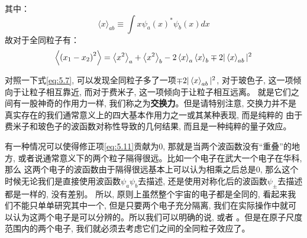 \documentclass[a4paper,zihao=-4,linespread=1]{ctexrep}
\begin{document}
    其中：
    \begin{equation}
        \label{eq:5.11}
        \langle x\rangle_{a b} \equiv \int x \psi_{a}(x)^{*} \psi_{b}(x) d x
    \end{equation}
    故对于全同粒子有：
    \begin{equation}
        \Braket{\left(x_1-x_2\right)^2}=\Braket{x^2}_a+\Braket{x^2}_b-2\Braket{x}_a\Braket{x}_b\mp 2|\Braket{x}_{ab}|^2
    \end{equation}
    
    对照一下式\ref{eq:5.7}, 可以发现全同粒子多了一项$\mp 2|\Braket{x}_{ab}|^2$, 对于玻色子, 这一项倾向于让粒子相互靠近, 而对于费米子, 这一项倾向于让粒子相互远离。
    就是它们之间有一股神奇的作用力一样, 我们称之为\textbf{交换力}。但是请特别注意, 交换力并不是真实存在的我们通常意义上的四大基本作用力之一或其某种表现, 而是纯粹的
    由于费米子和玻色子的波函数对称性导致的几何结果, 而且是一种纯粹的量子效应。

    有一种情况可以使得修正项\ref{eq:5.11}贡献为0, 那就是当两个波函数没有“重叠”的地方, 或者说通常意义下的两个粒子隔得很远。比如一个电子在武大一个电子在华科, 那么
    这两个电子的波函数由于隔得很远基本上可以认为相乘之后总是0, 那么这个时候无论我们是直接使用波函数$\psi_a\psi_b$去描述, 还是使用对称化后的波函数$\psi_\pm$去描述都是一样的, 没有差别。
    所以, 原则上虽然整个宇宙的电子都是全同的, 看起来我们不能只单单研究其中一个, 但是只要两个电子充分隔离, 我们在实际操作中就可以认为这两个电子是可以分辨的。所以我们可以明确的说, 或者
    。但是在原子尺度范围内的两个电子, 我们就必须去考虑它们之间的全同粒子效应了。
\end{document}

